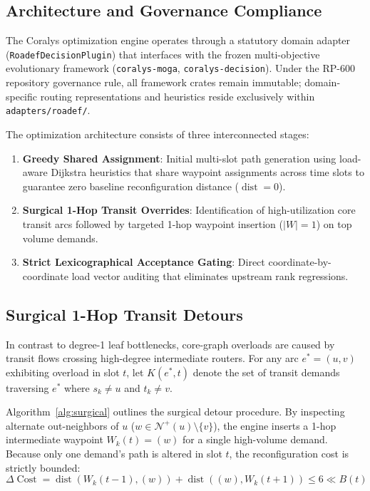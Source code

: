 \documentclass[10pt,journal,compsoc]{IEEEtran}
\begin{document}
\subsection{Architecture and Governance Compliance}
The Coralys optimization engine operates through a statutory domain adapter (\texttt{RoadefDecisionPlugin}) that interfaces with the frozen multi-objective evolutionary framework (\texttt{coralys-moga}, \texttt{coralys-decision}). Under the RP-600 repository governance rule, all framework crates remain immutable; domain-specific routing representations and heuristics reside exclusively within \texttt{adapters/roadef/}.

The optimization architecture consists of three interconnected stages:
\begin{enumerate}
    \item \textbf{Greedy Shared Assignment}: Initial multi-slot path generation using load-aware Dijkstra heuristics that share waypoint assignments across time slots to guarantee zero baseline reconfiguration distance ($\operatorname{dist} = 0$).
    \item \textbf{Surgical 1-Hop Transit Overrides}: Identification of high-utilization core transit arcs followed by targeted 1-hop waypoint insertion ($|W| = 1$) on top volume demands.
    \item \textbf{Strict Lexicographical Acceptance Gating}: Direct coordinate-by-coordinate load vector auditing that eliminates upstream rank regressions.
\end{enumerate}

\subsection{Surgical 1-Hop Transit Detours}
In contrast to degree-1 leaf bottlenecks, core-graph overloads are caused by transit flows crossing high-degree intermediate routers. For any arc $e^* = (u, v)$ exhibiting overload in slot $t$, let $K(e^*, t)$ denote the set of transit demands traversing $e^*$ where $s_k \neq u$ and $t_k \neq v$.

Algorithm~\ref{alg:surgical} outlines the surgical detour procedure. By inspecting alternate out-neighbors of $u$ ($w \in \mathcal{N}^+(u) \setminus \{v\}$), the engine inserts a 1-hop intermediate waypoint $W_k(t) = (w)$ for a single high-volume demand. Because only one demand's path is altered in slot $t$, the reconfiguration cost is strictly bounded:
\begin{equation}
\Delta \operatorname{Cost} = \operatorname{dist}(W_k(t-1), (w)) + \operatorname{dist}((w), W_k(t+1)) \le 6 \ll B(t)
\end{equation}
\end{document}
